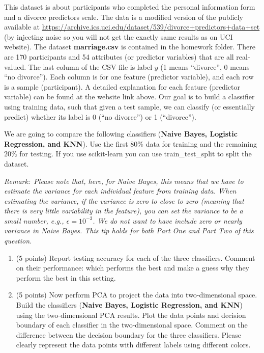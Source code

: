 \documentclass[12pt]{article}
\begin{document}
This dataset is about participants who completed the personal information form and a divorce predictors scale.  The data is a modified version of the publicly available at  \url{https://archive.ics.uci.edu/dataset/539/divorce+predictors+data+set} (by injecting noise so you will not get the exactly same results as on UCI website).  The dataset \textbf{marriage.csv} is contained in the homework folder. There are 170 participants and 54 attributes (or predictor variables) that are all real-valued. The last column of the CSV file is label $y$ (1 means ``divorce'', 0 means ``no divorce''). Each column is for one feature (predictor variable), and each row is a sample (participant). A detailed explanation for each feature (predictor variable) can be found at the website link above. Our goal is to build a classifier using training data, such that given a test sample, we can classify (or essentially predict) whether its label is 0 (``no divorce'') or 1 (``divorce''). 

We are going to compare the following classifiers  ({\bf Naive Bayes, Logistic Regression, and KNN}). Use the first $80\%$ data for training and the remaining $20\%$ for testing. If you use \textsf{scikit-learn} you can use \textsf{train\_test\_split} to split the dataset. 

\textit{Remark: Please note that, here, for Naive Bayes, this means that we have to estimate the variance for each individual feature from training data. When estimating the variance, if the variance is zero to close to zero (meaning that there is very little variability in the feature), you can set the variance to be a small number, e.g., $\epsilon = 10^{-3}$. We do not want to have include zero or nearly variance in Naive Bayes. This tip holds for both Part One and Part Two of this question.}


\begin{enumerate}

	\item (5 points) Report testing accuracy for each of the three classifiers.  Comment on their performance: which performs the best and make a guess why they perform the best in this setting. 
	\item (5 points) Now perform PCA to project the data into two-dimensional space. Build the classifiers  ({\bf Naive Bayes, Logistic Regression, and KNN}) using the two-dimensional PCA results. Plot the data points and decision boundary of each classifier in the two-dimensional space. Comment on the difference between the decision boundary for the three classifiers. Please clearly represent the data points with different labels using different colors.
	
\end{enumerate}
\end{document}
